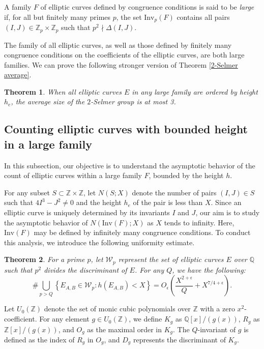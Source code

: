 \documentclass{article}
\def\Z{{\mathbb Z}}
\def\Q{{\mathbb Q}}
\def\Z{{\mathbb Z}}
\def\Q{{\mathbb Q}}
\newtheorem{theorem}{Theorem}[section]
\begin{document}
A family $F$ of elliptic curves defined by congruence conditions is said to be \textit{large} if, for all but finitely many primes $p$, the set $\mathrm{Inv}_p(F)$ contains all pairs $(I, J) \in \mathbb{Z}_p \times \mathbb{Z}_p$ such that $p^2 \nmid \Delta(I, J)$.

The family of all elliptic curves, as well as those defined by finitely many congruence conditions on the coefficients of the elliptic curves, are both large families. We can prove the following stronger version of Theorem \ref{2-Selmer average}.


\begin{theorem}\label{2-selmer-bound}
    When all elliptic curves $E$ in any large family are ordered by height $h_e$, the average size of the $2$-Selmer group is at most 3.
\end{theorem}

\subsection{Counting elliptic curves with bounded height in a large family}
In this subsection, our objective is to understand the asymptotic behavior of the count of elliptic curves within a large family $F$, bounded by the height $h$.

For any subset $S \subset \mathbb{Z} \times \mathbb{Z}$, let $N(S; X)$ denote the number of pairs $(I, J) \in S$ such that $4I^3 - J^2 \neq 0$ and the height $h_e$ of the pair is less than $X$. Since an elliptic curve is uniquely determined by its invariants $I$ and $J$, our aim is to study the asymptotic behavior of $N(\text{Inv}(F); X)$ as $X$ tends to infinity. Here, $\text{Inv}(F)$ may be defined by infinitely many congruence conditions. To conduct this analysis, we introduce the following uniformity estimate.



\begin{theorem}\label{IJ-Sieve}
    For a prime $p$, let $\mathcal{W}_{p}$ represent the set of elliptic curves $E$ over $\Q$ such that $p^2$ divides the discriminant of $E$. For any $Q$, we have the following:
    \begin{equation*}
      \#\bigcup_{p>Q} \left\{E_{A,B} \in \mathcal{W}_p:h(E_{A,B})<X\right\} = O_{\epsilon}\left( \frac{X^{2+\epsilon}}{Q}+ X^{7/4+\epsilon}\right).
    \end{equation*}
\end{theorem}
Let $U_0(\Z)$ denote the set of monic cubic polynomials over $\Z$ with a zero $x^2$-coefficient. For any element $g \in U_0(\Z)$, we define $K_g$ as $\Q[x]/(g(x))$, $R_g$ as $\Z[x]/(g(x))$, and $O_g$ as the maximal order in $K_g$. The $Q$-invariant of $g$ is defined as the index of $R_g$ in $O_g$, and $D_g$ represents the discriminant of $K_g$.
\end{document}
